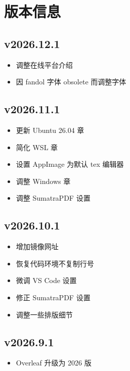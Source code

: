 
\twocolumn

\chapter{版本信息}

\section*{v2026.12.1}

\begin{itemize}
  \item 调整在线平台介绍
  \item 因 fandol 字体 obsolete 而调整字体
\end{itemize}

\section*{v2026.11.1}

\begin{itemize}
  \item 更新 Ubuntu 26.04 章
  \item 简化 WSL 章
  \item 设置 AppImage 为默认 tex 编辑器
  \item 调整 Windows 章
  \item 调整 SumatraPDF 设置
\end{itemize}

\section*{v2026.10.1}

\begin{itemize}
  \item 增加镜像网址
  \item 恢复代码环境不复制行号
  \item 微调 VS Code 设置
  \item 修正 SumatraPDF 设置
  \item 调整一些排版细节
\end{itemize}

\section*{v2026.9.1}

\begin{itemize}
  \item Overleaf 升级为 2026 版
\end{itemize}

